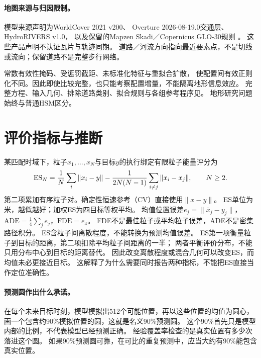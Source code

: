 \paragraph{地图来源与归因限制。}
模型来源声明为WorldCover 2021 v200\cite{worldcover2021}、
Overture 2026-08-19.0交通层\cite{overture202608,overtureattribution}、
HydroRIVERS v1.0\cite{hydrorivers2013,hydroriverslicense}，
以及保留的Mapzen Skadi／Copernicus GLO-30规则
\cite{mapzenterrain,mapzenattribution,copernicusdem2021}。
这些产品声明不认证瓦片与轨迹同期。
道路／河流方向指向最近要素点，不是切线或流向；保留道路不是完整步行网络。

常数有效性掩码、受惩罚截距、未标准化特征与重拟合扩散，
使配置间有效正则化不同。因此即使比较完整，也只能考察配置增量，不能隔离地形信息效应。
完整方程、输入几何、排除道路类别、拟合规则与各组参考程序见。
地形研究问题始终与普通HSM区分。

\section{评价指标与推断}
某匹配时域下，粒子$x_1,\ldots,x_N$与目标$y$的执行绑定有限粒子能量评分为
\begin{equation}\label{eq:finite-es}
 \operatorname{ES}_N=\frac1N\sum_i\|x_i-y\|
       -\frac1{2N(N-1)}\sum_{i\ne j}\|x_i-x_j\|,\qquad N\geq2.
\end{equation}
第二项累加有序粒子对。确定性恒速参考（CV）直接使用$\|x-y\|$。
ES单位为米，越低越好；加权ES为四目标等权平均。
均值位置误差$e_j=\|\bar x_j-y_j\|$，
$\mathrm{ADE}=\tfrac14\sum_j e_j$，$\mathrm{FDE}=e_4$。
FDE不是最佳粒子或平均粒子误差，ADE不是密集路径积分。
ES含粒子间离散程度，不能转换为预测均值误差。
ES第一项衡量粒子到目标的距离，第二项扣除平均粒子间距离的一半；
两者平衡评价分布，不能只用分布中心到目标的距离替代。
因此改变离散程度或混合几何可以改变ES，而均值未必更接近目标。
这解释了为什么需要同时报告两种指标，不能把ES直接当作定位准确性。

\paragraph{预测圆作出什么承诺。}
在每个未来目标时刻，模型模拟出512个可能位置，再以这些位置的均值为圆心，
画一个包含约90\%模拟位置的圆，这就是名义90\%预测圆。
这个90\%首先只是模型内部的比例，不代表模型已经预测正确。
经验覆盖率检查的是真实位置有多少次落进这个圆。
如果90\%预测圆可靠，在可比的重复预测中，应当大约有90\%能包含真实位置。

